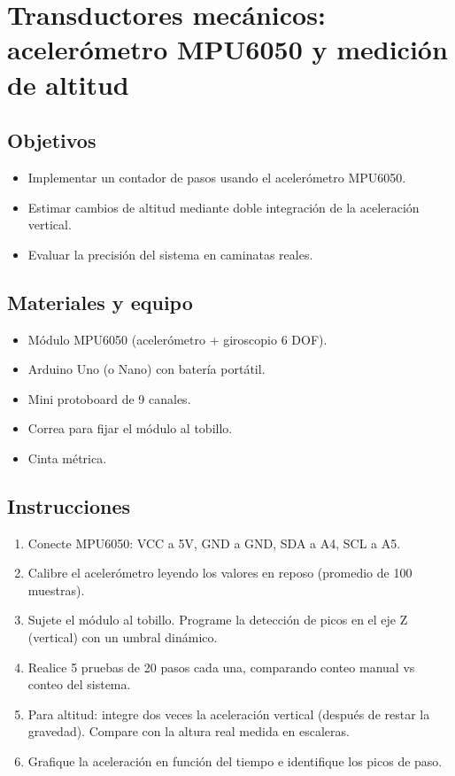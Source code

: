 \chapter{Transductores mecánicos: acelerómetro MPU6050 y medición de altitud}

\section*{Objetivos}
\begin{itemize}
    \item Implementar un contador de pasos usando el acelerómetro MPU6050.
    \item Estimar cambios de altitud mediante doble integración de la aceleración vertical.
    \item Evaluar la precisión del sistema en caminatas reales.
\end{itemize}

\section*{Materiales y equipo}
\begin{itemize}
    \item Módulo MPU6050 (acelerómetro + giroscopio 6 DOF).
    \item Arduino Uno (o Nano) con batería portátil.
    \item Mini protoboard de 9 canales.
    \item Correa para fijar el módulo al tobillo.
    \item Cinta métrica.
\end{itemize}

\section*{Instrucciones}
\begin{enumerate}
    \item Conecte MPU6050: VCC a 5V, GND a GND, SDA a A4, SCL a A5.
    \item Calibre el acelerómetro leyendo los valores en reposo (promedio de 100 muestras).
    \item Sujete el módulo al tobillo. Programe la detección de picos en el eje Z (vertical) con un umbral dinámico.
    \item Realice 5 pruebas de 20 pasos cada una, comparando conteo manual vs conteo del sistema.
    \item Para altitud: integre dos veces la aceleración vertical (después de restar la gravedad). Compare con la altura real medida en escaleras.
    \item Grafique la aceleración en función del tiempo e identifique los picos de paso.
\end{enumerate}

